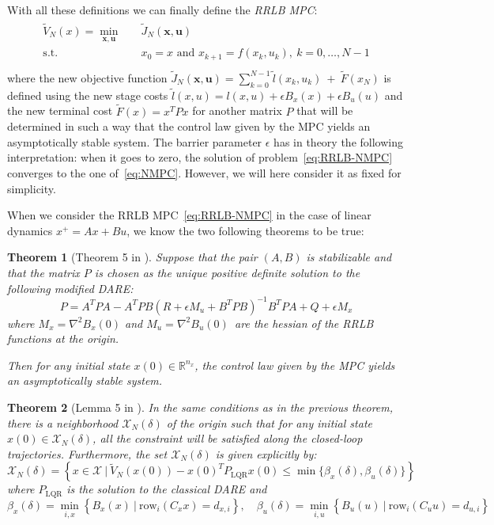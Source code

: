 \documentclass[journal]{IEEEtran}
\newtheorem{theorem}{Theorem}[section]
\theoremstyle{definition}
\theoremstyle{remark}
\def\cal#1{\mathcal{#1}}
\def\rm#1{\mathrm{#1}}
\def\bf#1{\mathbf{#1}}
\newcommand{\R}{\mathbb{R}}
\begin{document}
\noindent With all these definitions we can finally define the \textit{RRLB MPC}:
\begin{align}
	\begin{split}\label{eq:RRLB-NMPC}
		\tilde{V}_N(x)=\underset{\bf{x},\bf{u}}{\min} &\quad \tilde{J}_N(\bf{x},\bf{u})\\
		\text{s.t.} &\quad x_0=x\text{ and }x_{k+1}=f(x_k,u_k),~k=0,\ldots,N-1\\
	\end{split}
\end{align}
where the new objective function $\tilde{J}_N(\bf{x},\bf{u})=\sum_{k=0}^{N-1}\tilde{l}(x_k,u_k)~+~\tilde{F}(x_N)$ is defined using the new stage costs $\tilde{l}(x,u)=l(x,u)+\epsilon B_x(x)+\epsilon B_u(u)$ and the new terminal cost $\tilde{F}(x)=x^TPx$ for another matrix $P$ that will be determined in such a way that the control law given by the MPC yields an asymptotically stable system.
The barrier parameter $\epsilon$ has in theory the following interpretation: when it goes to zero, the solution of problem~\ref{eq:RRLB-NMPC} converges to the one of~\ref{eq:NMPC}.
However, we will here consider it as fixed for simplicity.

\vspace{12pt}

\noindent When we consider the RRLB MPC~\ref{eq:RRLB-NMPC} in the case of linear dynamics $x^+=Ax+Bu$, we know the two following theorems to be true:

\begin{theorem}[Theorem 5 in \cite{RRLB-linear-MPC}]
	\label{nominal-stability-linear-case}
	Suppose that the pair $(A,B)$ is stabilizable and that the matrix $P$ is chosen as the unique positive definite solution to the following modified DARE:
	$$P=A^TPA-A^TPB(R+\epsilon M_u+B^TPB)^{-1}B^TPA+Q+\epsilon M_x$$
	where $M_x=\nabla^2 B_x(0)$ and $M_u=\nabla^2 B_u(0)$\, are the hessian of the RRLB functions at the origin.

	Then for any initial state $x(0)\in\R^{n_x}$, the control law given by the MPC yields an asymptotically stable system.
\end{theorem}

\begin{theorem}[Lemma 5 in \cite{RRLB-linear-MPC}]
	\label{constraint-satisfaction-guarantee-linear-case}
	In the same conditions as in the previous theorem, there is a neighborhood $\cal{X}_N(\delta)$ of the origin such that for any initial state $x(0)\in\cal{X}_N(\delta)$, all the constraint will be satisfied along the closed-loop trajectories.
	Furthermore, the set $\cal{X}_N(\delta)$ is given explicitly by:
	$$\cal{X}_N(\delta)=\left\{x\in\cal{X}~|~\tilde{V}_N(x(0))-x(0)^TP_{\rm{LQR}}x(0)\leq\min\{\beta_x(\delta),\beta_u(\delta)\}\right\}$$
	where $P_{\rm{LQR}}$ is the solution to the classical DARE and
	$$\beta_x(\delta)=\underset{i,x}{\min}\left\{ B_x(x)~|~\rm{row}_i(C_xx)=d_{x,i} \right\},\quad \beta_u(\delta)=\underset{i,u}{\min}\left\{ B_u(u)~|~\rm{row}_i(C_uu)=d_{u,i} \right\}$$
\end{theorem}
\end{document}
